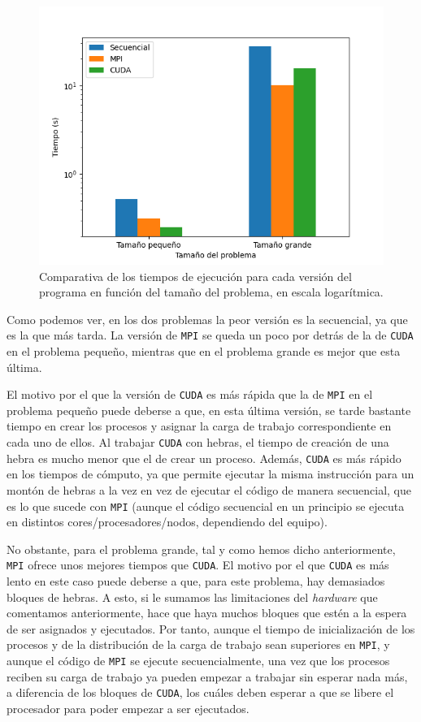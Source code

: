 \documentclass[11pt,a4paper]{article}
\begin{document}
\begin{figure}[H]
  \centering
  \includegraphics[scale=0.6]{img/comparison}
  \caption{Comparativa de los tiempos de ejecución para cada versión del programa en función
  del tamaño del problema, en escala logarítmica.}
\end{figure}

Como podemos ver, en los dos problemas la peor versión es la secuencial, ya que es la
que más tarda. La versión de \texttt{MPI} se queda un poco por detrás de la de \texttt{CUDA}
en el problema pequeño, mientras que en el problema grande es mejor que esta última.

El motivo por el que la versión de \texttt{CUDA} es más rápida que la de \texttt{MPI} en el
problema pequeño puede deberse a que, en esta última versión, se tarde bastante tiempo en
crear los procesos y asignar la carga de trabajo correspondiente en cada uno de ellos. Al
trabajar \texttt{CUDA} con hebras, el tiempo de creación de una hebra es mucho menor
que el de crear un proceso. Además, \texttt{CUDA} es más rápido en los tiempos de cómputo,
ya que permite ejecutar la misma instrucción para un montón de hebras
a la vez en vez de ejecutar el código de manera secuencial, que es lo que sucede con
\texttt{MPI} (aunque el código secuencial en un principio se ejecuta en distintos
cores/procesadores/nodos, dependiendo del equipo).

No obstante, para el problema grande, tal y como hemos dicho anteriormente, \texttt{MPI}
ofrece unos mejores tiempos que \texttt{CUDA}. El motivo por el que \texttt{CUDA} es más
lento en este caso puede deberse a que, para este problema, hay demasiados bloques de
hebras. A esto, si le sumamos las limitaciones del \textit{hardware} que comentamos
anteriormente, hace que haya muchos bloques que estén a la espera de ser asignados y ejecutados.
Por tanto, aunque el tiempo de inicialización de los procesos y de la distribución 
de la carga de trabajo sean superiores en \texttt{MPI}, y aunque el código de
\texttt{MPI} se ejecute secuencialmente, una vez que los procesos reciben su carga de
trabajo ya pueden empezar a trabajar sin esperar nada más, a diferencia de los bloques
de \texttt{CUDA}, los cuáles deben esperar a que se libere el procesador para poder
empezar a ser ejecutados.
\end{document}
